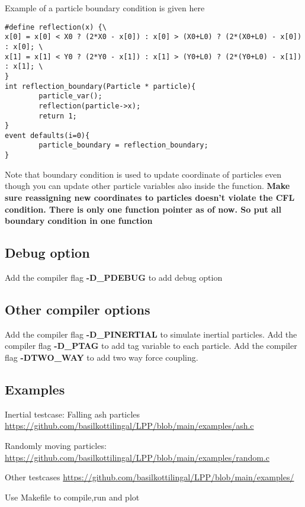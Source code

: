 \documentclass[a4paper,12pt]{article}
\begin{document}
    
    Example of a particle boundary condition is given here
    \begin{lstlisting}[style=CStyle]
#define reflection(x) {\                                                                            
x[0] = x[0] < X0 ? (2*X0 - x[0]) : x[0] > (X0+L0) ? (2*(X0+L0) - x[0]) : x[0]; \       
x[1] = x[1] < Y0 ? (2*Y0 - x[1]) : x[1] > (Y0+L0) ? (2*(Y0+L0) - x[1]) : x[1]; \       
}
int reflection_boundary(Particle * particle){
        particle_var();
        reflection(particle->x);
        return 1;
}
event defaults(i=0){
        particle_boundary = reflection_boundary;
}
    \end{lstlisting}
    Note that boundary condition is used to update coordinate of particles even though you can update other particle variables also inside the function. 
    \textbf{Make sure reassigning new coordinates to particles doesn't violate the CFL condition. There is only one function pointer as of now. So put all boundary condition in one function}
    
    \subsection{Debug option}
    Add the compiler flag \textbf{-D\_PDEBUG} to add debug option
    
    
    
    
    \subsection{Other compiler options}
    Add the compiler flag \textbf{-D\_PINERTIAL} to simulate inertial particles.
    Add the compiler flag \textbf{-D\_PTAG} to add tag variable to each particle.
    Add the compiler flag \textbf{-DTWO\_WAY} to add two way force coupling.

    
    \subsection{Examples}
    Inertial testcase:
    Falling ash particles \url{https://github.com/basilkottilingal/LPP/blob/main/examples/ash.c}
    
    Randomly moving particles: 
    \url{https://github.com/basilkottilingal/LPP/blob/main/examples/random.c}
    
    Other testcases \url{https://github.com/basilkottilingal/LPP/blob/main/examples/}
    
    Use Makefile to compile,run and plot
    

    
    
    
\end{document}
